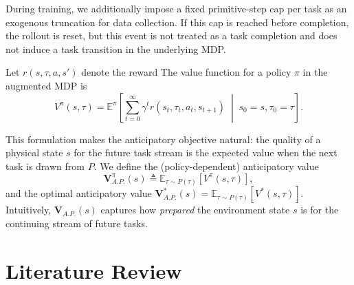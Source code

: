 \documentclass[10pt]{article} %
\begin{document}
During training, we additionally impose a fixed primitive-step cap per task as an exogenous truncation for data collection. If this cap is reached before completion, the rollout is reset, but this event is not treated as a task completion and does not induce a task transition in the underlying MDP.

Let $r(s,\tau,a,s')$ denote the reward 
The value function for a policy $\pi$ in the augmented MDP is
\begin{equation}
    V^{\pi}(s,\tau) = \mathbb{E}^{\pi}\left[\sum_{t=0}^{\infty} \gamma^{t} r(s_t,\tau_t,a_t,s_{t+1}) \;\middle|\; s_0=s,\tau_0=\tau\right].
\end{equation}

This formulation makes the anticipatory objective natural: the quality of a physical state $s$ for the future task stream is the expected value when the next task is drawn from $P$.
We define the (policy-dependent) anticipatory value
\begin{equation}
    \boldsymbol{V}^{\pi}_{A.P.}(s) \triangleq \mathbb{E}_{\tau \sim P(\tau)}\left[ V^{\pi}(s,\tau) \right],
\end{equation}
and the optimal anticipatory value $\boldsymbol{V}^{*}_{A.P.}(s) = \mathbb{E}_{\tau \sim P(\tau)}\left[ V^{*}(s,\tau) \right]$. Intuitively, $\boldsymbol{V}_{A.P.}(s)$ captures how \textit{prepared} the environment state $s$ is for the continuing stream of future tasks.






\section{Literature Review}
\label{sec:literature}
\end{document}
